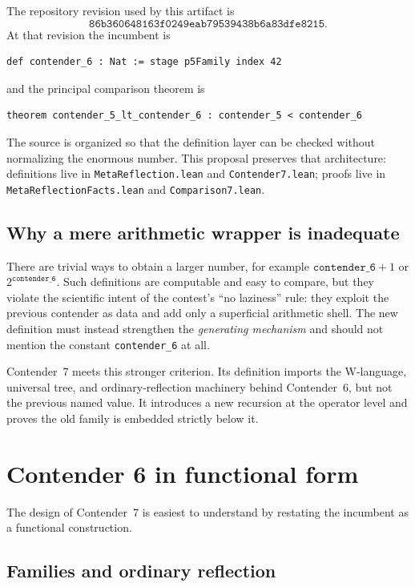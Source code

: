 \documentclass[11pt]{article}
\theoremstyle{definition}
\theoremstyle{remark}
\newcommand{\lean}[1]{\texttt{#1}}
\newcommand{\codepath}[1]{\texttt{#1}}
\begin{document}
The repository revision used by this artifact is
\[
\texttt{86b360648163f0249eab79539438b6a83dfe8215}.
\]
At that revision the incumbent is
\begin{lstlisting}
def contender_6 : Nat := stage p5Family index 42
\end{lstlisting}
and the principal comparison theorem is
\begin{lstlisting}
theorem contender_5_lt_contender_6 : contender_5 < contender_6
\end{lstlisting}
The source is organized so that the definition layer can be checked without
normalizing the enormous number.  This proposal preserves that architecture:
definitions live in \codepath{MetaReflection.lean} and
\codepath{Contender7.lean}; proofs live in
\codepath{MetaReflectionFacts.lean} and \codepath{Comparison7.lean}.

\subsection{Why a mere arithmetic wrapper is inadequate}

There are trivial ways to obtain a larger number, for example
\(\lean{contender\_6}+1\) or \(2^{\lean{contender\_6}}\).  Such definitions are
computable and easy to compare, but they violate the scientific intent of the
contest's ``no laziness'' rule: they exploit the previous contender as data and
add only a superficial arithmetic shell.  The new definition must instead
strengthen the \emph{generating mechanism} and should not mention the constant
\lean{contender\_6} at all.

Contender~7 meets this stronger criterion.  Its definition imports the
W-language, universal tree, and ordinary-reflection machinery behind
Contender~6, but not the previous named value.  It introduces a new recursion
at the operator level and proves the old family is embedded strictly below it.

\section{Contender 6 in functional form}
\label{sec:c6}

The design of Contender~7 is easiest to understand by restating the incumbent
as a functional construction.

\subsection{Families and ordinary reflection}
\end{document}
